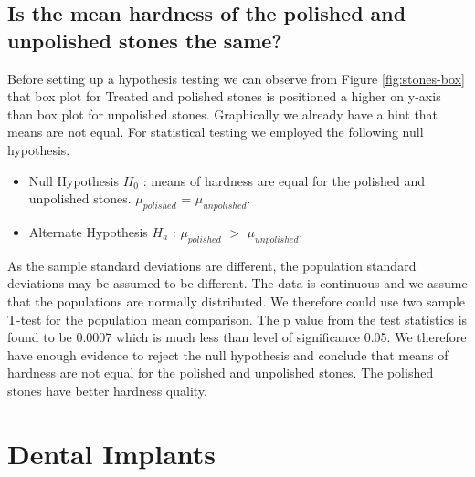 \documentclass[12pt,a4paper]{style}
\begin{document}
	\subsection{Is the mean hardness of the polished and unpolished stones the same?}
	Before setting up a hypothesis testing we can observe from Figure \ref{fig:stones-box} that box plot for Treated and polished stones is positioned a higher on y-axis than box plot for unpolished stones. Graphically we already have a hint that means are not equal. For statistical testing we employed the following null hypothesis. 
	\begin{itemize}
		\item Null Hypothesis $H_0$ : means of hardness are equal for the polished and unpolished stones. $\mu_{polished}$ = $\mu_{unpolished}$.
		\item Alternate Hypothesis $H_a$ : $\mu_{polished}$ $>$ $\mu_{unpolished}$.
	\end{itemize}
	As the sample standard deviations are different, the population standard deviations may be assumed to be different. The data is continuous and we assume that the populations are normally distributed. We therefore could use two sample T-test for the population mean comparison.  
	The p value from the test statistics is found to be 0.0007 which is much less than level of significance 0.05. We therefore have enough evidence to reject the null hypothesis and conclude that means of hardness are not equal for the polished and unpolished stones. The polished stones have better hardness quality. 
	\section{Dental Implants}
	
\end{document}

